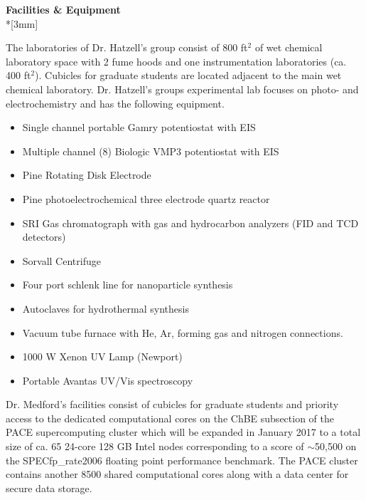 \renewcommand{\LeftFooter}{Facilities \& Equipment}
\renewcommand{\PageLimit}{0}
\begin{center}
{\bf Facilities \& Equipment} \\*[3mm]
\end{center}

\setcounter{section}{0}


{\setlength{\parindent}{0cm}The laboratories of Dr. Hatzell’s group consist of 800 ft$^2$ of wet chemical laboratory space with 2 fume hoods and one instrumentation laboratories (ca. 400 ft$^2$). Cubicles for graduate students are located adjacent to the main wet chemical laboratory. Dr. Hatzell's groups experimental lab focuses on photo- and electrochemistry and has the following equipment.}
\begin{itemize}
\item Single channel portable Gamry potentiostat with EIS
\item Multiple channel (8) Biologic VMP3 potentiostat with EIS
\item Pine Rotating Disk Electrode 
\item Pine photoelectrochemical three electrode quartz reactor
\item SRI Gas chromatograph with gas and hydrocarbon analyzers (FID and TCD detectors)
\item Sorvall Centrifuge
\item Four port schlenk line for nanoparticle synthesis
\item Autoclaves for hydrothermal synthesis
\item Vacuum tube furnace with He, Ar, forming gas and nitrogen connections. 
\item 1000 W Xenon UV Lamp (Newport) 
\item Portable Avantas UV/Vis spectroscopy
\end{itemize}
Dr. Medford’s facilities consist of cubicles for graduate students and priority access to the dedicated computational cores on the ChBE subsection of the PACE supercomputing cluster which will be expanded in January 2017 to a total size of ca. 65 24-core 128 GB Intel nodes corresponding to a score of $\sim$50,500 on the SPECfp\_rate2006 floating point performance benchmark. The PACE cluster contains another 8500 shared computational cores along with a data center for secure data storage.


